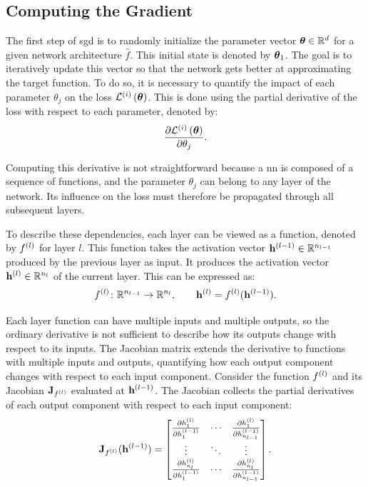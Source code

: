 \subsection{Computing the Gradient}

The first step of \gls{sgd} is to randomly initialize the parameter vector $\boldsymbol{\theta} \in \mathbb{R}^d$ for a given network architecture $\hat{f}$.
This initial state is denoted by $\boldsymbol{\theta}_{1}$.
The goal is to iteratively update this vector so that the network gets better at approximating the target function.
To do so, it is necessary to quantify the impact of each parameter $\theta_j$ on the loss $\mathcal{L}^{(i)}\left(\boldsymbol{\theta}\right)$.
This is done using the partial derivative of the loss with respect to each parameter, denoted by:
\[
\frac{\partial \mathcal{L}^{(i)}\left(\boldsymbol{\theta}\right)}{\partial \theta_j}.
\]

Computing this derivative is not straightforward because a \gls{nn} is composed of a sequence of functions, and the parameter $\theta_j$ can belong to any layer of the network.
Its influence on the loss must therefore be propagated through all subsequent layers.

To describe these dependencies, each layer can be viewed as a function, denoted by $f^{(l)}$ for layer $l$.
This function takes the activation vector $\latentRepresentation[l-1] \in \mathbb{R}^{n_{l-1}}$ produced by the previous layer as input.
It produces the activation vector $\latentRepresentation[l] \in \mathbb{R}^{n_l}$ of the current layer.
This can be expressed as:
\begin{equation}
\LayerFunction{l} \colon \mathbb{R}^{n_{l-1}} \to \mathbb{R}^{n_l}, \qquad \latentRepresentation[l] = \LayerFunction{l}(\latentRepresentation[l-1]).
\label{eq:layer_function}
\end{equation}

Each layer function can have multiple inputs and multiple outputs, so the ordinary derivative is not sufficient to describe how its outputs change with respect to its inputs.
The Jacobian matrix extends the derivative to functions with multiple inputs and outputs, quantifying how each output component changes with respect to each input component.
Consider the function $f^{(l)}$ and its Jacobian $\mathbf{J}_{f^{(l)}}$ evaluated at $\latentRepresentation[l-1]$.
The Jacobian collects the partial derivatives of each output component with respect to each input component:
\begin{equation}
\mat{J}_{\LayerFunction{l}}(\latentRepresentation[l-1]) =
\begin{bmatrix}
\frac{\partial h_1^{(l)}}{\partial h_1^{(l-1)}} & \cdots & \frac{\partial h_1^{(l)}}{\partial h_{n_{l-1}}^{(l-1)}} \\
\vdots & \ddots & \vdots \\
\frac{\partial h_{n_l}^{(l)}}{\partial h_1^{(l-1)}} & \cdots & \frac{\partial h_{n_l}^{(l)}}{\partial h_{n_{l-1}}^{(l-1)}}
\end{bmatrix}.
\label{eq:jacobian}
\end{equation}

